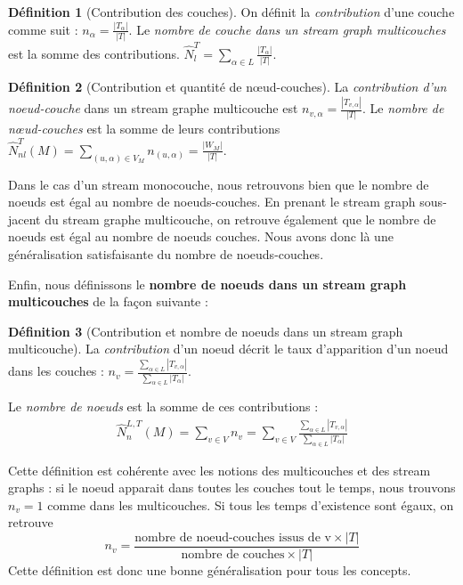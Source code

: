 \documentclass[11pt,a4paper]{article}
\theoremstyle{definition}
\newtheorem{defn}{Définition}
\theoremstyle{remark}
\theoremstyle{remark}
\begin{document}
	
	\begin{defn}[Contribution des couches]
	On définit la {\em contribution} d'une couche comme suit : $n_\alpha = \frac{|T_{\alpha}|}{|T|}$. Le {\em nombre de couche dans un stream graph multicouches} est la somme des contributions. $\hat{N}^T_l = \sum_{\alpha \in L}\frac{ |T_{\alpha}|}{|T|}$.
    \end{defn}
	
	\begin{defn}[Contribution et quantité de nœud-couches]
	La {\em contribution d'un noeud-couche} dans un stream graphe multicouche est $n_{v,\alpha} = \frac{|T_{v,\alpha}|}{|T|}$. Le {\em nombre de nœud-couches} est la somme de leurs contributions $\hat{N}^{T}_{nl}(M) = \underset{(u,\alpha)\in V_M}{\sum} n_{(u,\alpha)} = \frac{|W_M|}{|T|}$.
    \end{defn}
	
	Dans le cas d'un stream monocouche, nous retrouvons bien que le nombre de noeuds est égal au nombre de noeuds-couches. En prenant le stream graph sous-jacent du stream graphe multicouche, on retrouve également que le nombre de noeuds est égal au nombre de noeuds couches. Nous avons donc là une généralisation satisfaisante du nombre de noeuds-couches.
    
   Enfin, nous définissons le \textbf{nombre de noeuds dans un stream graph multicouches} de la façon suivante : 
    
    \begin{defn}[Contribution et nombre de noeuds dans un stream graph multicouche]
    La {\em contribution} d'un noeud décrit le taux d'apparition d'un noeud dans les couches : $n_v = \frac{\sum_{\alpha \in L}|T_{v,\alpha}|}{\sum_{\alpha \in L} |T_{\alpha}|}$.
    
    Le {\em nombre de noeuds} est la somme de ces contributions :
    \begin{align}
    \hat{N}^{L,T}_n(M) = \sum_{v\in V} n_v= \sum_{v\in V} \frac{\sum_{\alpha \in L}|T_{v,\alpha}|}{\sum_{\alpha \in L} |T_{\alpha}|} 
    \label{numberNodes}
	\end{align}     
	
	\end{defn}
	
	Cette définition est cohérente avec les notions des multicouches et des stream graphs : si le noeud apparait dans toutes les couches tout le temps, nous trouvons $n_v=1$ comme dans les multicouches. Si tous les temps d'existence sont égaux, on retrouve $$n_v=\frac{\text{nombre de noeud-couches issus de v}\times |T|}{\text{nombre de couches}\times |T|}$$ Cette définition est donc une bonne généralisation pour tous les concepts.
\end{document}
